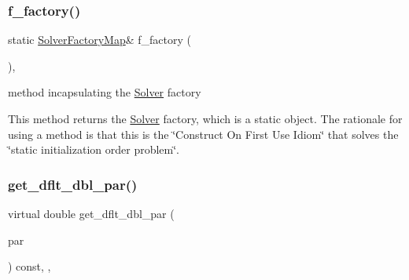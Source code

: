 \mbox{\label{class_s_m_spp__di__unipi__it_1_1_solver_a118d563efb394530fe4b808bb3c1afbf}} 
\subsubsection{\texorpdfstring{f\+\_\+factory()}{f\_factory()}}
{\footnotesize\ttfamily static \mbox{\hyperlink{class_s_m_spp__di__unipi__it_1_1_solver_a648aad605b7d80ef4469835bb60fc6c4}{Solver\+Factory\+Map}}\& f\+\_\+factory (\begin{DoxyParamCaption}\item[{void}]{ }\end{DoxyParamCaption})\hspace{0.3cm}{\ttfamily [static]}, {\ttfamily [protected]}}



method incapsulating the \mbox{\hyperlink{class_s_m_spp__di__unipi__it_1_1_solver}{Solver}} factory 

This method returns the \mbox{\hyperlink{class_s_m_spp__di__unipi__it_1_1_solver}{Solver}} factory, which is a static object. The rationale for using a method is that this is the \char`\"{}\+Construct On First
\+Use Idiom\char`\"{} that solves the \char`\"{}static initialization order problem\char`\"{}. \mbox{\label{class_s_m_spp__di__unipi__it_1_1_solver_a465a771c115acf8d5f4e32e22f003014}} 
\subsubsection{\texorpdfstring{get\+\_\+dflt\+\_\+dbl\+\_\+par()}{get\_dflt\_dbl\_par()}}
{\footnotesize\ttfamily virtual double get\+\_\+dflt\+\_\+dbl\+\_\+par (\begin{DoxyParamCaption}\item[{const \mbox{\hyperlink{class_s_m_spp__di__unipi__it_1_1_thin_compute_interface_aa3d710629ad8c434286726ad810c3b47}{idx\+\_\+type}}}]{par }\end{DoxyParamCaption}) const\hspace{0.3cm}{\ttfamily [inline]}, {\ttfamily [override]}, {\ttfamily [virtual]}}



